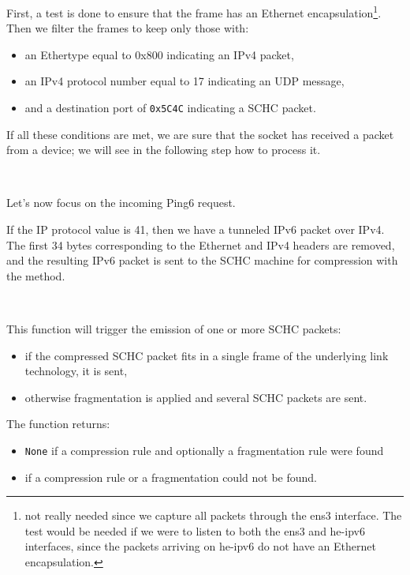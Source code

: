 First, a test is done to ensure that the frame has an Ethernet encapsulation\footnote{not really needed since we capture all packets through the ens3 interface. The test would be needed if we were to listen to both the ens3 and he-ipv6 interfaces, since the packets arriving on he-ipv6 do not have an Ethernet encapsulation.}.
Then we filter the frames to keep only those with:
\begin{itemize}
    \item an Ethertype equal to 0x800 indicating an IPv4 packet,
    \item an IPv4 protocol number equal to 17 indicating an UDP message,
    \item and a destination port of \texttt{0x5C4C} indicating a SCHC packet.
\end{itemize}

If all these conditions are met, we are sure that the socket has received a packet from a device; we will see in the following step how to process it.

~

Let's now focus on the incoming Ping6 request.




If the IP protocol value is 41, then we have a tunneled IPv6 packet over IPv4. The first 34 bytes corresponding to the Ethernet and IPv4 headers are removed, and the resulting IPv6 packet is sent to the SCHC machine for compression with the  method. 

~~

This function will trigger the emission of one or more SCHC packets: 
\begin{itemize}
    \item if the compressed SCHC packet fits in a single frame of the underlying link technology, it is sent,
    \item otherwise fragmentation is applied and several SCHC packets are sent.
\end{itemize}

The function returns:
\begin{itemize}
    \item \texttt{None} if a compression rule and optionally a fragmentation rule were found
    \item {} if a compression rule or a fragmentation could not be found.
\end{itemize}


